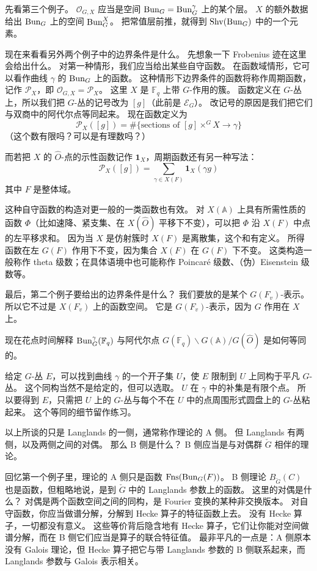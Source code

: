 先看第三个例子。
$\mathcal O_{G,X}$ 应当是空间 $\operatorname{Bun}_G=\operatorname{Bun}^\gamma_G$ 上的某个层。
$X$ 的额外数据给出 $\operatorname{Bun}_G$ 上的空间 $\operatorname{Bun}^X_G$。
把常值层前推，就得到 $\operatorname{Shv}(\operatorname{Bun}_G)$ 中的一个元素。

现在来看看另外两个例子中的边界条件是什么。
先想象一下 Frobenius 迹在这里会给出什么。
对第一种情形，我们应当给出某些自守函数。
在函数域情形，它可以看作曲线 $\gamma$ 的 $\operatorname{Bun}_G$ 上的函数。
这种情形下边界条件的函数将称作周期函数，记作 $\mathcal P_X$，即 $\mathcal O_{G,X}=\mathcal P_X$。
这里 $X$ 是 $\mathbb F_q$ 上带 $G$-作用的簇。
函数定义在 $G$-丛上，所以我们把 $G$-丛的记号改为 $[g]$（此前是 $\mathcal E_G$）。
改记号的原因是我们把它们与双商中的阿代尔点等同起来。
现在函数定义为
\[
  \mathcal P_X([g])=\#\{\text{sections of }[g]\times^G X\to\gamma\}
\]
（这个数有限吗？可以是有理数吗？）

而若把 $X$ 的 $\hat O$-点的示性函数记作 $\mathbf 1_X$，周期函数还有另一种写法：
\[
  \mathcal P_X([g])=\sum_{\gamma\in X(F)}\mathbf 1_X(\gamma g)
\]
其中 $F$ 是整体域。

这种自守函数的构造对更一般的一类函数也有效。
对 $X(\mathbb A)$ 上具有所需性质的函数 $\Phi$（比如速降、紧支集、在 $X(\hat O)$ 平移下不变），可以把 $\Phi$ 沿 $X(F)$ 中点的左平移求和。
因为当 $X$ 是仿射簇时 $X(F)$ 是离散集，这个和有定义。
所得函数在左 $G(F)$ 作用下不变，因为集合 $X(F)$ 在 $G(F)$ 下不变。
这类构造一般称作 theta 级数；在具体语境中也可能称作 Poincaré 级数、（伪）Eisenstein 级数等。

最后，第二个例子要给出的边界条件是什么？
我们要放的是某个 $G(F_v)$-表示。
所以它不过是 $X(F_v)$ 上的函数空间。
它是 $G(F_v)$-表示，因为 $G$ 作用在 $X$ 上。

现在花点时间解释 $\operatorname{Bun}^\gamma_G(\mathbb F_q)$ 与阿代尔点 $G(\mathbb F_q)\backslash G(\mathbb A)/G(\hat O)$ 是如何等同的。

给定 $G$-丛 $E$，可以找到曲线 $\gamma$ 的一个开子集 $U$，使 $E$ 限制到 $U$ 上同构于平凡 $G$-丛。
这个同构当然不是给定的，但可以选取。
$U$ 在 $\gamma$ 中的补集是有限个点。
所以要得到 $E$，只需把 $U$ 上的 $G$-丛与每个不在 $U$ 中的点周围形式圆盘上的 $G$-丛粘起来。
这个等同的细节留作练习。

以上所谈的只是 Langlands 的一侧，通常称作理论的 A 侧。
但 Langlands 有两侧，以及两侧之间的对偶。
那么 B 侧是什么？
B 侧应当是与对偶群 $\check G$ 相伴的理论。

回忆第一个例子里，理论的 A 侧只是函数 $\operatorname{Fns}(\operatorname{Bun}_G(F))$。
B 侧理论 $B_{\check G}(C)$ 也是函数，但粗略地说，是到 $\check G$ 中的 Langlands 参数上的函数。
这里的对偶是什么？
对偶是两个函数空间之间的同构，是 Fourier 变换的某种非交换版本。
对自守函数，你应当做谱分解，分解到 Hecke 算子的特征函数上去。
没有 Hecke 算子，一切都没有意义。
这些等价背后隐含地有 Hecke 算子，它们让你能对空间做谱分解，而在 B 侧它们应当是算子的联合特征值。
最非平凡的一点是：A 侧原本没有 Galois 理论，但 Hecke 算子把它与带 Langlands 参数的 B 侧联系起来，而 Langlands 参数与 Galois 表示相关。

